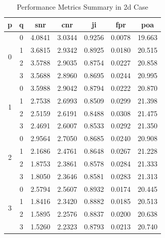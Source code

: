 \begin{table}[htbp!]
\centering
\caption{Performance Metrics Summary in \gls{2d} Case}
\begin{tabular}{ccccccc}
\hline
\textbf{p} & \textbf{q} & \textbf{\gls{snr}} & \textbf{\gls{cnr}} & \gls{ji} & \gls{fpr} & \gls{poa} \\ \hline
\multirow{4}{*}{0} & 0 & 4.0841 & 3.0344 & 0.9256 & 0.0078 & 19.663 \\
 & 1 & 3.6815 & 2.9342 & 0.8925 & 0.0180 & 20.515 \\
 & 2 & 3.5788 & 2.9035 & 0.8754 & 0.0227 & 20.858 \\
 & 3 & 3.5688 & 2.8960 & 0.8695 & 0.0244 & 20.995 \\ \hline
\multirow{4}{*}{1} & 0 & 3.5988 & 2.9042 & 0.8794 & 0.0222 & 20.870 \\
 & 1 & 2.7538 & 2.6993 & 0.8509 & 0.0299 & 21.398 \\
 & 2 & 2.5159 & 2.6191 & 0.8488 & 0.0308 & 21.475 \\
 & 3 & 2.4691 & 2.6007 & 0.8533 & 0.0292 & 21.350 \\ \hline
\multirow{4}{*}{2} & 0 & 2.9564 & 2.7050 & 0.8685 & 0.0240 & 20.908 \\
 & 1 & 2.1686 & 2.4761 & 0.8648 & 0.0267 & 21.228 \\
 & 2 & 1.8753 & 2.3861 & 0.8578 & 0.0284 & 21.333 \\
 & 3 & 1.8050 & 2.3646 & 0.8581 & 0.0283 & 21.313 \\ \hline
\multirow{4}{*}{3} & 0 & 2.5794 & 2.5607 & 0.8932 & 0.0174 & 20.445 \\
 & 1 & 1.8416 & 2.3420 & 0.8882 & 0.0185 & 20.513 \\
 & 2 & 1.5895 & 2.2576 & 0.8837 & 0.0200 & 20.638 \\
 & 3 & 1.5260 & 2.2323 & 0.8793 & 0.0213 & 20.740 \\ \hline
\end{tabular}
\label{tab:perfSum2D}
\end{table}


